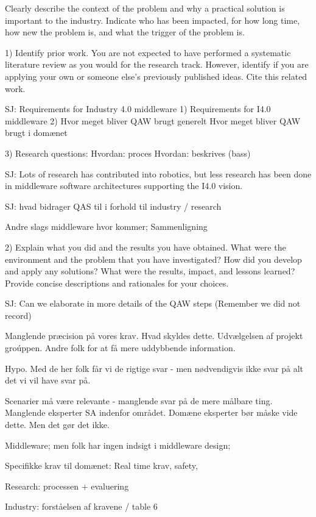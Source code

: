  Clearly describe the context of the problem and why a practical solution is important to the industry. Indicate who has been impacted, for how long time, how new the problem is, and what the trigger of the problem is.
 

 1) Identify prior work. You are not expected to have performed a systematic literature review as you would for the research track. However, identify if you are applying your own or someone else’s previously published ideas. Cite this related work.
 
 SJ: Requirements for Industry 4.0 middleware
 1)
 Requirements for I4.0 middleware 
 2)
 Hvor meget bliver QAW brugt generelt 
 Hvor meget bliver QAW brugt i domænet
 
 3)
 Research questions:
 Hvordan: proces
 Hvordan: beskrives (bass)
 
 
 SJ: Lots of research has contributed into robotics, but less research has been done in middleware software architectures supporting the I4.0 vision.
 
 SJ: hvad bidrager QAS til i forhold til industry / research
 
 
 Andre slags middleware hvor kommer;
 Sammenligning
 
 2) Explain what you did and the results you have obtained. What were the environment and the problem that you have investigated? How did you develop and apply any solutions? What were the results, impact, and lessons learned? Provide concise descriptions and rationales for your choices.
 
 SJ: Can we elaborate in more details of the QAW steps (Remember we did not record)
 
 Manglende præcision på vores krav. Hvad skyldes dette. Udvælgelsen af projekt groúppen. Andre folk for at få mere uddybbende information.
 
 Hypo. Med de her folk får vi de rigtige svar - men nødvendigvis ikke svar på alt det vi vil have svar på.
 
 Scenarier må være relevante - manglende svar på de mere målbare ting. Manglende eksperter SA indenfor området. Domæne eksperter bør måske vide dette. Men det gør det ikke.
 
 Middleware; men folk har ingen indsigt i middleware design; 
 
 Specifikke krav til domænet: Real time krav, safety, 
 
 Research: processen + evaluering 
 
 Industry:  forståelsen af kravene / table 6
 
